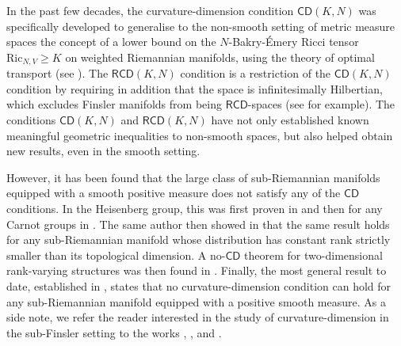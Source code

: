 \documentclass[11pt,twoside,a4paper]{article}
\newcommand{\red}{\color{red}}
\newcommand{\cd}{\mathsf{CD}}
\newcommand{\RCD}{\mathsf{RCD}}
\theoremstyle{theorem}
\theoremstyle{definition}
\theoremstyle{remark}
\theoremstyle{proof}
\begin{document}
In the past few decades, the curvature-dimension condition $\mathsf{CD}(K, N)$ was specifically developed to generalise to the non-smooth setting of metric measure spaces
the concept of a lower bound on the $N$-Bakry-Émery Ricci tensor $\mathrm{Ric}_{N,V} \geq K$ on weighted Riemannian manifolds, using the theory of optimal transport (see \cite{villani,lott--villani2009, sturm2006}).
The $\RCD(K,N)$ condition is a restriction of the $\cd(K,N)$ condition by requiring in addition that the space is infinitesimally Hilbertian, which excludes Finsler manifolds from being $\RCD$-spaces (see \cite{ambrosioICMs, Gigli12,Erbar2015} for example).
The conditions $\cd(K,N)$ and $\RCD(K,N)$ have not only established known meaningful geometric inequalities to non-smooth spaces, but also helped obtain new results, even in the smooth setting.

However, it has been found that the large class of sub-Riemannian manifolds equipped with a smooth positive measure does not satisfy any of the $\mathsf{CD}$ conditions. In the Heisenberg group, this was first proven in \cite{juillet2005} and then for any Carnot groups in \cite{ambrosio2020}. The same author then showed in \cite{juillet2020} that the same result holds for any sub-Riemannian manifold whose distribution has constant rank strictly smaller than its topological dimension. A no-$\mathsf{CD}$ theorem for two-dimensional rank-varying structures was then found in \cite{magnaboscorossi}. Finally, the most general result to date, established in \cite{rizzi2023failure}, states that no curvature-dimension condition can hold for any sub-Riemannian manifold equipped with a positive smooth measure. As a side note, we refer the reader interested in the study of curvature-dimension in the sub-Finsler setting to the works \cite{borzatashiro}, \cite{magnabosco2023failure}, \cite{borzatashiroSIU2024n1} and \cite{borzatashiroSIU2024n2}.
\end{document}
